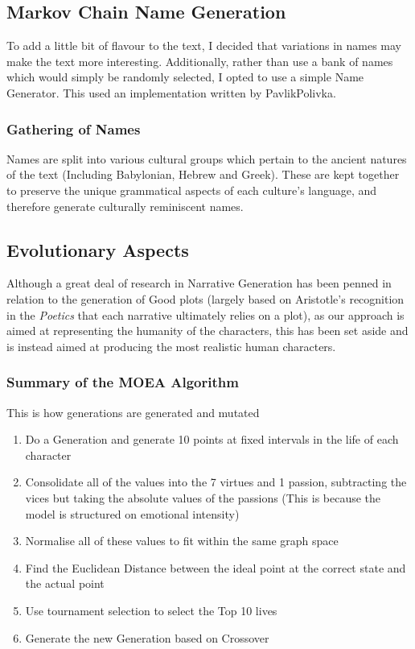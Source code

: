 \documentclass[11pt]{article}
\begin{document}
\subsection{Markov Chain Name Generation}
To add a little bit of flavour to the text, I decided that variations in names may make the text more interesting. Additionally, rather than use a bank of names which would simply be randomly selected, I opted to use a simple Name Generator. This used an implementation written by PavlikPolivka.

\subsubsection{Gathering of Names}
Names are split into various cultural groups which pertain to the ancient natures of the text (Including Babylonian, Hebrew and Greek). These are kept together to preserve the unique grammatical aspects of each culture's language, and therefore generate culturally reminiscent names. 

\subsection{Evolutionary Aspects}
Although a great deal of research in Narrative Generation has been penned in relation to the generation of Good plots (largely based on Aristotle's recognition in the \textit{Poetics} that each narrative ultimately relies on a plot), as our approach is aimed at representing the humanity of the characters, this has been set aside and is instead aimed at producing the most realistic human characters. 

\subsubsection{Summary of the MOEA Algorithm}
This is how generations are generated and mutated\:
\begin{enumerate}
	\item Do a Generation and generate 10 points at fixed intervals in the life of each character
	\item Consolidate all of the values into the 7 virtues and 1 passion, subtracting the vices but taking the absolute values of the passions (This is because the model is structured on emotional intensity)
	\item Normalise all of these values to fit within the same graph space
	\item Find the Euclidean Distance between the ideal point at the correct state and the actual point
	\item Use tournament selection to select the Top 10 lives
	\item Generate the new Generation based on Crossover
\end{enumerate}
\end{document}
